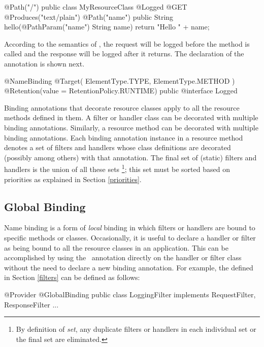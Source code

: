 \begin{listing}{1}
@Path("/")
public class MyResourceClass {
    @Logged
    @GET
    @Produces("text/plain")
    @Path("{name}")
    public String hello(@PathParam("name") String name) {
        return "Hello " + name;
    }
}
\end{listing}

According to the semantics of , the request will be logged before the  method is called and the response will be logged after it returns. The declaration of the  annotation is shown next.

\begin{listing}{1}
@NameBinding
@Target({ ElementType.TYPE, ElementType.METHOD })
@Retention(value = RetentionPolicy.RUNTIME)
public @interface Logged { }
\end{listing}

Binding annotations that decorate resource classes apply to all the resource methods defined in them. A filter or handler class can be decorated with multiple binding annotations. Similarly, a resource method can be decorated with multiple binding annotations.  Each binding annotation instance in a resource method denotes a set of filters and handlers whose class definitions are decorated (possibly among others) with that annotation. The final set of (static) filters and handlers is the union of all these sets \footnote{By definition of {\em set}, any duplicate filters or handlers in each individual set or the final set are eliminated.}; this set must be sorted based on priorities as explained in Section \ref{priorities}. 

\subsection{Global Binding}

Name binding is a form of {\em local} binding in which filters or handlers are bound to specific methods or classes. Occasionally, it is useful to declare a handler or filter as being bound to all the resource classes in an application. This can be accomplished by using the \GlobalBinding\ annotation directly on the handler or filter class without the need to declare a new binding annotation. For example, the  defined in Section \ref{filters} can be defined as follows:

\begin{listing}{1}
@Provider
@GlobalBinding
public class LoggingFilter implements RequestFilter, ResponseFilter {
    ...
}
\end{listing}

